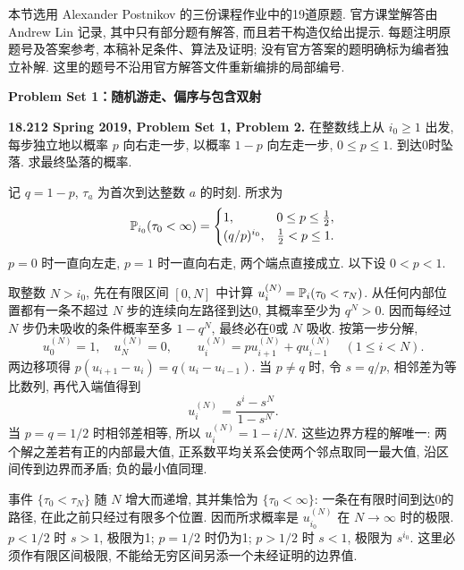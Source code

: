 本节选用 Alexander Postnikov 的三份课程作业中的19道原题. 官方课堂解答由 Andrew Lin 记录, 其中只有部分题有解答, 而且若干构造仅给出提示. 每题注明原题号及答案参考, 本稿补足条件、算法及证明; 没有官方答案的题明确标为编者独立补解. 这里的题号不沿用官方解答文件重新编排的局部编号.

\par\medskip\noindent\textbf{Problem Set 1：随机游走、偏序与包含双射}

\begin{exercise}\label{mit:18212-pset1-q2}
\textbf{18.212 Spring 2019, Problem Set 1, Problem 2.}
在整数线上从 $i_0\ge1$ 出发, 每步独立地以概率 $p$ 向右走一步, 以概率 $1-p$ 向左走一步, $0\le p\le1$. 到达0时坠落. 求最终坠落的概率.
\end{exercise}
\begin{solution}
记 $q=1-p$, $\tau_a$ 为首次到达整数 $a$ 的时刻. 所求为
\[
 \mathbb P_{i_0}(\tau_0<\infty)=
 \begin{cases}1,&0\le p\le\tfrac12,\\(q/p)^{i_0},&\tfrac12<p\le1.\end{cases}
\]
$p=0$ 时一直向左走, $p=1$ 时一直向右走, 两个端点直接成立. 以下设 $0<p<1$.

取整数 $N>i_0$, 先在有限区间 $[0,N]$ 中计算
$u_i^{(N)}=\mathbb P_i(\tau_0<\tau_N)$. 从任何内部位置都有一条不超过 $N$ 步的连续向左路径到达0, 其概率至少为 $q^N>0$. 因而每经过 $N$ 步仍未吸收的条件概率至多 $1-q^N$, 最终必在0或 $N$ 吸收. 按第一步分解,
\[
 u_0^{(N)}=1,\quad u_N^{(N)}=0,\qquad
 u_i^{(N)}=p u_{i+1}^{(N)}+q u_{i-1}^{(N)}\quad(1\le i<N).
\]
两边移项得 $p(u_{i+1}-u_i)=q(u_i-u_{i-1})$. 当 $p\ne q$ 时, 令 $s=q/p$, 相邻差为等比数列, 再代入端值得到
\[
 u_i^{(N)}=\frac{s^i-s^N}{1-s^N}.
\]
当 $p=q=1/2$ 时相邻差相等, 所以 $u_i^{(N)}=1-i/N$. 这些边界方程的解唯一: 两个解之差若有正的内部最大值, 正系数平均关系会使两个邻点取同一最大值, 沿区间传到边界而矛盾; 负的最小值同理.

事件 $\{\tau_0<\tau_N\}$ 随 $N$ 增大而递增, 其并集恰为 $\{\tau_0<\infty\}$: 一条在有限时间到达0的路径, 在此之前只经过有限多个位置. 因而所求概率是 $u_{i_0}^{(N)}$ 在 $N\to\infty$ 时的极限. $p<1/2$ 时 $s>1$, 极限为1; $p=1/2$ 时仍为1; $p>1/2$ 时 $s<1$, 极限为 $s^{i_0}$. 这里必须作有限区间极限, 不能给无穷区间另添一个未经证明的边界值.
\end{solution}

